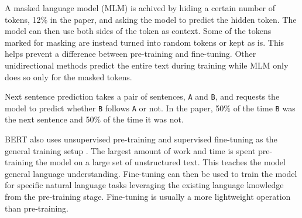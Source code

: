 \documentclass[twoside]{article}
\begin{document}
A masked language model (MLM) is achived by hiding a certain number of tokens, 12\% in the paper, and
asking the model to predict the hidden token. The model can then use both sides of the token as
context. Some of the tokens marked for masking are instead turned 
into random tokens or kept as is. This helps prevent a difference between pre-training and fine-tuning.
Other unidirectional methods predict the entire text during training while MLM only 
does so only for the masked tokens. \cite{devlin_bert_2019}

Next sentence prediction takes a pair of sentences, \texttt{A} and \texttt{B}, and requests the model
to predict whether \texttt{B} follows \texttt{A} or not. In the paper, 50\% of the time \texttt{B} 
was the next sentence and 50\% of the time it was not. \cite{devlin_bert_2019}

BERT also uses unsupervised pre-training and supervised fine-tuning as the general training setup \cite{devlin_bert_2019}.
The largest amount of work and time is spent pre-training the model on a large set of unstructured
text. This teaches the model general language understanding. Fine-tuning can then be used to 
train the model for specific natural language tasks leveraging the existing language knowledge 
from the pre-training stage. Fine-tuning is usually a more lightweight operation than pre-training.
\end{document}
